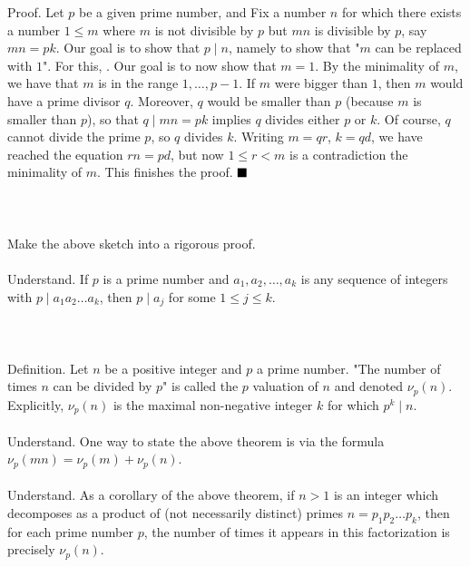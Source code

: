 \documentclass[english]{article}
\newcommand\cyan[1]{{\color{blue}{#1}}}
\newcommand\red[1]{{\color{red}{#1}}}
\newcommand\task{\red{Task. }}
\newcommand{\qed}{$\hfill\blacksquare$}
\begin{document}
Proof. Let $p$ be a given prime number, and \red{suppose the theorem holds for all smaller prime numbers.} Fix a number $n$ for which there exists a number $1\le m$ where $m$ is not divisible by $p$ but $mn$ is divisible by $p$, say $mn=pk$. Our goal is to show that $p\mid n$, namely to show that "$m$ can be replaced with $1$". For this, \red{we shall assume the $m$ we picked is the smallest of all its possible values}. Our goal is to now show that $m=1$. By the minimality of $m$, we have that $m$ is in the range $1,\dots,p-1$. If $m$ were bigger than $1$, then $m$ would have a prime divisor $q$. Moreover, $q$ would be smaller than $p$ (because $m$ is smaller than $p$), so that $q\mid mn=pk$ implies $q$ divides either $p$ or $k$. Of course, $q$ cannot divide the prime $p$, so $q$ divides $k$. Writing $m=qr$, $k=qd$, we have reached the equation $rn=pd$, but now $1\le r < m$ is a contradiction the minimality of $m$. This finishes the proof. \qed
\\\\
\cyan{Let us sketch a second proof. Again, suppose $p=97$ and $m=15$. Then $97\mid 15n$, and we want to deduce that $97\mid n$. We notice it is easier to increase $15$ as follows: we must have $97\mid 30n$, then $97\mid 90n$. But this yields $97\mid 7n$, and we replaced $15$ by the smaller $7$. We can repeat this argument to make the $7$ smaller, etc.}
\\\\
\task Make the above sketch into a rigorous proof.
\\\\
Understand. If $p$ is a prime number and $a_1,a_2,\dots,a_k$ is any sequence of integers with $p\mid a_1a_2\dots a_k$, then $p\mid a_j$ for some $1\le j\le k$.
\\\\
\cyan{The reason $2$ appears exactly $3$ times in the prime factorization $24=2\cdot2\cdot2\cdot3$ is because we can divide $24$ by $2$ three times, but no more. Namely, $24/2=12$, $12/2=6$, $6/2=3$, and $3$ cannot be divided by $2$. More generally.}
\\\\
Definition. Let $n$ be a positive integer and $p$ a prime number. "The number of times $n$ can be divided by $p$" is called the $p$ valuation of $n$ and denoted $\nu_p(n)$. Explicitly, $\nu_p(n)$ is the maximal non-negative integer $k$ for which $p^k\mid n$.
\\\\
Understand. One way to state the above theorem is via the formula $\nu_p(mn)=\nu_p(m)+\nu_p(n)$.
\\\\
Understand. As a corollary of the above theorem, if $n>1$ is an integer which decomposes as a product of (not necessarily distinct) primes $n=p_1p_2\dots p_k$, then for each prime number $p$, the number of times it appears in this factorization is precisely $\nu_p(n)$.
\end{document}

